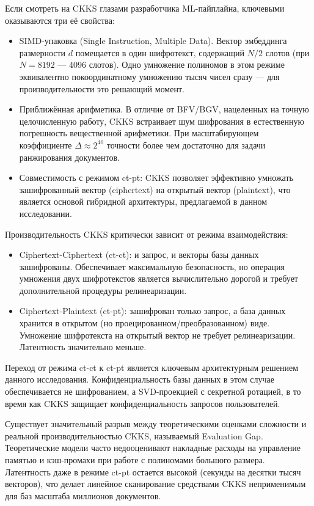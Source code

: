 \documentclass[a4paper, 12pt, oneside, openany]{article}
\begin{document}
Если смотреть на CKKS глазами разработчика ML-пайплайна, ключевыми оказываются три её свойства:
\begin{itemize}
	\item
	SIMD-упаковка (Single Instruction, Multiple Data). Вектор эмбеддинга размерности $d$ помещается в один шифротекст, содержащий $N/2$ слотов (при $N = 8192$ — 4096 слотов). Одно умножение полиномов в этом режиме эквивалентно покоординатному умножению тысяч чисел сразу — для производительности это решающий момент.
\end{itemize}

\begin{itemize}
	\item
	Приближённая арифметика. В отличие от BFV/BGV, нацеленных на точную целочисленную работу, CKKS встраивает шум шифрования в естественную погрешность вещественной арифметики. При масштабирующем коэффициенте $\Delta \approx 2^{40}$ точности более чем достаточно для задачи ранжирования документов.
	\item
	Совместимость с режимом ct-pt: CKKS позволяет эффективно умножать зашифрованный вектор (ciphertext) на открытый вектор (plaintext), что является основой гибридной архитектуры, предлагаемой в данном исследовании.
\end{itemize}

Производительность CKKS критически зависит от режима взаимодействия:
\begin{itemize}
	\item
	Ciphertext-Ciphertext (ct-ct): и запрос, и векторы базы данных зашифрованы. Обеспечивает максимальную безопасность, но операция умножения двух шифротекстов является вычислительно дорогой и требует дополнительной процедуры релинеаризации.
	\item
	Ciphertext-Plaintext (ct-pt): зашифрован только запрос, а база данных хранится в открытом (но проецированном/преобразованном) виде. Умножение шифротекста на открытый вектор не требует релинеаризации. Латентность значительно меньше.
\end{itemize}

Переход от режима ct-ct к ct-pt является ключевым архитектурным решением данного исследования. Конфиденциальность базы данных в этом случае обеспечивается не шифрованием, а SVD-проекцией с секретной ротацией, в то время как CKKS защищает конфиденциальность запросов пользователей.

Существует значительный разрыв между теоретическими оценками сложности и реальной производительностью CKKS, называемый Evaluation Gap. Теоретические модели часто недооценивают накладные расходы на управление памятью и кэш-промахи при работе с полиномами большого размера. Латентность даже в режиме ct-pt остается высокой (секунды на десятки тысяч векторов), что делает линейное сканирование средствами CKKS неприменимым для баз масштаба миллионов документов.
\end{document}
